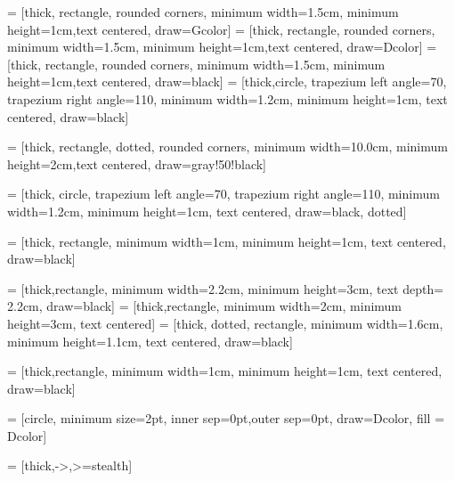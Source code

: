 

 = [thick, rectangle, rounded corners, minimum width=1.5cm, minimum height=1cm,text centered, draw=Gcolor]
 = [thick, rectangle, rounded corners, minimum width=1.5cm, minimum height=1cm,text centered, draw=Dcolor]
 = [thick, rectangle, rounded corners, minimum width=1.5cm, minimum height=1cm,text centered, draw=black]
 = [thick,circle, trapezium left angle=70, trapezium right angle=110, minimum width=1.2cm, minimum height=1cm, text centered, draw=black]

 = [thick, rectangle, dotted, rounded corners, minimum width=10.0cm, minimum height=2cm,text centered, draw=gray!50!black]

 = [thick, circle, trapezium left angle=70, trapezium right angle=110, minimum width=1.2cm, minimum height=1cm, text centered, draw=black, dotted]

 = [thick, rectangle, minimum width=1cm, minimum height=1cm, text centered, draw=black]

 = [thick,rectangle, minimum width=2.2cm, minimum height=3cm, text depth= 2.2cm, draw=black]
 = [thick,rectangle, minimum width=2cm, minimum height=3cm, text centered]
 = [thick, dotted, rectangle, minimum width=1.6cm, minimum height=1.1cm, text centered, draw=black]


 = [thick,rectangle, minimum width=1cm, minimum height=1cm, text centered, draw=black]


 = [circle, minimum size=2pt, inner sep=0pt,outer sep=0pt, draw=Dcolor, fill = Dcolor]

 = [thick,->,>=stealth]

